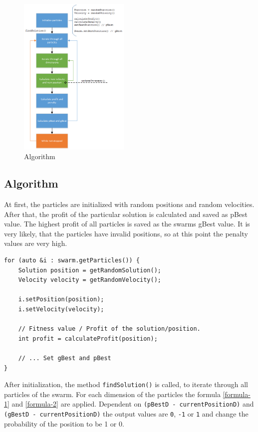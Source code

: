 \documentclass{article}
\begin{document}
\begin{figure}[H]
    \centering
    \includegraphics[width=200px]{images/algo.png}
    \caption{Algorithm}
    \label{fig-algo}
\end{figure}

\subsection{Algorithm}
At first, the particles are initialized with random positions and random velocities. After that, the profit of the particular solution is calculated and saved as pBest value. The highest profit of all particles is saved as the swarms gBest value. It is very likely, that the particles have invalid positions, so at this point the penalty values are very high.

\begin{lstlisting}[caption="Solver.cpp"]
for (auto &i : swarm.getParticles()) {
	Solution position = getRandomSolution();
   	Velocity velocity = getRandomVelocity();

	i.setPosition(position);
	i.setVelocity(velocity);
	
	// Fitness value / Profit of the solution/position.
	int profit = calculateProfit(position);
	
	// ... Set gBest and pBest
}
\end{lstlisting}

After initialization, the method \lstinline$findSolution()$ is called, to iterate through all particles of the swarm. For each dimension of the particles the formula \ref{formula-1} and \ref{formula-2} are applied. Dependent on \lstinline{(pBestD - currentPositionD)} and \lstinline{(gBestD - currentPositionD)} the output values are \lstinline$0$, \lstinline$-1$ or \lstinline$1$ and change the probability of the position to be 1 or 0.
\end{document}
